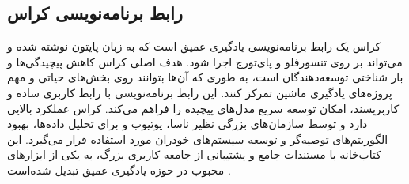 \subsection[رابط برنامه‌نویسی کراس]{رابط برنامه‌نویسی کراس\protect{}}
کراس یک رابط برنامه‌نویسی یادگیری عمیق است که به زبان پایتون نوشته شده و می‌تواند بر روی  تنسورفلو و پای‌تورچ  اجرا شود. هدف اصلی کراس کاهش پیچیدگی‌ها و بار شناختی توسعه‌دهندگان است، 
به طوری که آن‌ها بتوانند روی بخش‌های حیاتی و مهم پروژه‌های یادگیری ماشین تمرکز کنند. این رابط برنامه‌نویسی با رابط کاربری ساده و کاربرپسند، امکان توسعه سریع مدل‌های پیچیده را فراهم
می‌کند. کراس عملکرد بالایی دارد و توسط سازمان‌های بزرگی نظیر ناسا، یوتیوب و  برای تحلیل داده‌ها، بهبود الگوریتم‌های توصیه‌گر و توسعه سیستم‌های خودران مورد استفاده قرار 
می‌گیرد. این کتاب‌خانه با مستندات جامع و پشتیبانی از جامعه کاربری بزرگ، به یکی از ابزارهای محبوب در حوزه یادگیری عمیق تبدیل شده‌است \cite{AboutKer57:online}.


